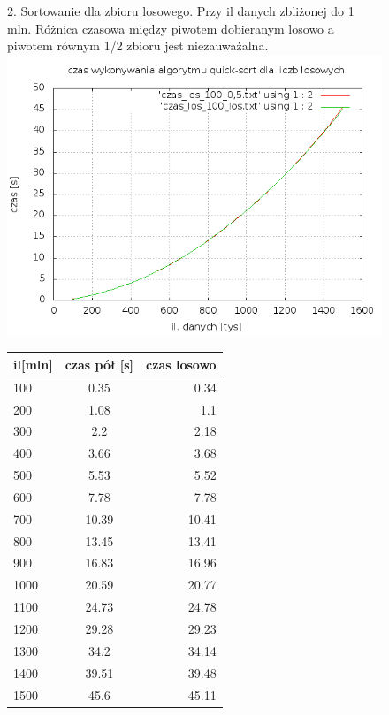 \documentclass[a4paper,11pt]{report}
\begin{document}
\begin{figure}
  \begin{center}
  2. Sortowanie dla zbioru losowego. Przy il danych zbliżonej do 1 mln. Różnica czasowa między piwotem dobieranym losowo a piwotem równym 1/2 zbioru jest niezauważalna. 
    \includegraphics[scale=0.5]{./czas_losowe_100.png}
    \label{fig:}
    \caption{}
          \begin{tabular}{|l|c|r|}
\hline
il[mln] & czas pół [s] & czas losowo \\
\hline

100  & 0.35 & 0.34\\
200  & 1.08 &1.1\\
300  & 2.2 &2.18\\
400  & 3.66 &3.68\\
500  & 5.53 &5.52\\
600  & 7.78 &7.78\\
700  & 10.39 &10.41\\
800  & 13.45 &13.41\\
900  & 16.83 &16.96\\
1000 & 20.59 &20.77\\
1100 & 24.73 &24.78\\
1200 & 29.28 &29.23\\
1300 & 34.2 &34.14\\
1400 & 39.51 &39.48\\
1500 & 45.6 &45.11\\
\hline
\end{tabular}
\newline
  \end{center}
\end{figure}
\end{document}
